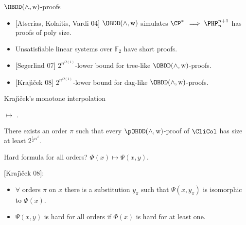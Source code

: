 \begin{frame}{$\OBDD(\land, \weakening)$-proofs}
    \begin{itemize}
        \item{} [Atserias, Kolaitis, Vardi 04] $\OBDD(\land, \weakening)$ simulates $\CP^*$
            \pause $\implies \PHP^{n + 1}_n$ has proofs of poly size.
        \pause
        \item{} Unsatisfiable linear systems over $\mathbb{F}_2$ have short proofs.
        \pause
        \item{} [Segerlind 07] $2^{n^{\Omega(1)}}$-lower bound for tree-like $\OBDD(\land,
            \weakening)$-proofs.
        \item{} [Kraj{\'{\i}}{\v{c}}ek 08] $2^{n^{\Omega(1)}}$-lower bound for dag-like $\OBDD(\land,
            \weakening)$-proofs.
    \end{itemize}
\end{frame}

\begin{frame}{Kraj{\'{\i}}{\v{c}}ek's monotone interpolation}

     $\mapsto$
    .

    \pause

    \begin{theorem}[Kraj{\'{\i}}{\v{c}}ek 08]
        There exists an order $\pi$ such that every $\pOBDD(\land, \weakening)$-proof of $\CliCol$ has
        size at least $2^{\frac{1}{2} n^\delta}$.
    \end{theorem}

    \pause
    Hard formula for all orders? \pause $\Phi(x) \mapsto \Psi(x, y)$.

    \pause
    {[Kraj{\'{\i}}{\v{c}}ek 08]}:
    \begin{itemize}
        \item $\forall$ orders $\pi$ on $x$ there is a substitution $y_{\pi}$ such that $\Psi(x,
            y_{\pi})$ is isomorphic to $\Phi(x)$.
        \item $\Psi(x, y)$ is hard for all orders if $\Phi(x)$ is hard for at least one.
    \end{itemize}
\end{frame}

